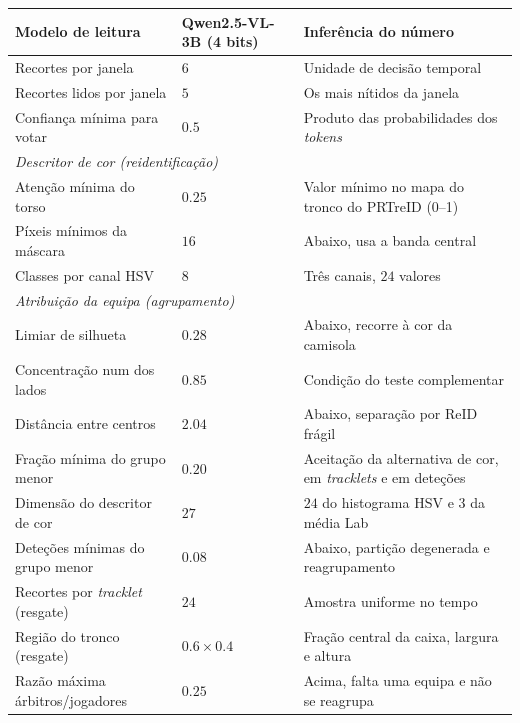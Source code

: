 \begin{table}[htbp]
\begin{tabular}{|l|l|l|}
        \hline
        Modelo de leitura            & Qwen2.5-VL-3B (4 bits) & Inferência do número \\
        \hline
        Recortes por janela          & $6$             & Unidade de decisão temporal \\
        \hline
        Recortes lidos por janela    & $5$             & Os mais nítidos da janela \\
        \hline
        Confiança mínima para votar  & $0.5$           & Produto das probabilidades dos \emph{tokens} \\
        \hline
        \multicolumn{3}{|l|}{\emph{Descritor de cor (reidentificação)}} \\
        \hline
        Atenção mínima do torso      & $0.25$          & Valor mínimo no mapa do tronco do PRTreID (0--1) \\
        \hline
        Píxeis mínimos da máscara    & $16$            & Abaixo, usa a banda central \\
        \hline
        Classes por canal HSV        & $8$             & Três canais, $24$ valores \\
        \hline
        \multicolumn{3}{|l|}{\emph{Atribuição da equipa (agrupamento)}} \\
        \hline
        Limiar de silhueta           & $0.28$          & Abaixo, recorre à cor da camisola \\
        \hline
        Concentração num dos lados   & $0.85$          & Condição do teste complementar \\
        \hline
        Distância entre centros      & $2.04$          & Abaixo, separação por ReID frágil \\
        \hline
        Fração mínima do grupo menor & $0.20$          & Aceitação da alternativa de cor, em \emph{tracklets} e em deteções \\
        \hline
        Dimensão do descritor de cor & $27$            & $24$ do histograma HSV e $3$ da média Lab \\
        \hline
        Deteções mínimas do grupo menor & $0.08$       & Abaixo, partição degenerada e reagrupamento \\
        \hline
        Recortes por \emph{tracklet} (resgate) & $24$  & Amostra uniforme no tempo \\
        \hline
        Região do tronco (resgate)   & $0.6 \times 0.4$ & Fração central da caixa, largura e altura \\
        \hline
        Razão máxima árbitros/jogadores & $0.25$       & Acima, falta uma equipa e não se reagrupa \\

\end{tabular}
\end{table}
